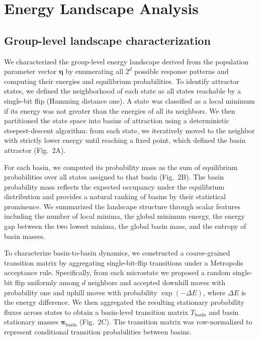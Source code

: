 \section{Energy Landscape Analysis}

\subsection{Group-level landscape characterization}

We characterized the group-level energy landscape derived from the population parameter vector $\boldsymbol{\eta}$ by enumerating all $2^d$ possible response patterns and computing their energies and equilibrium probabilities. To identify attractor states, we defined the neighborhood of each state as all states reachable by a single-bit flip (Hamming distance one). A state was classified as a local minimum if its energy was not greater than the energies of all its neighbors. We then partitioned the state space into basins of attraction using a deterministic steepest-descent algorithm: from each state, we iteratively moved to the neighbor with strictly lower energy until reaching a fixed point, which defined the basin attractor (Fig.~2A).

For each basin, we computed its probability mass as the sum of equilibrium probabilities over all states assigned to that basin (Fig.~2B). The basin probability mass reflects the expected occupancy under the equilibrium distribution and provides a natural ranking of basins by their statistical prominence. We summarized the landscape structure through scalar features including the number of local minima, the global minimum energy, the energy gap between the two lowest minima, the global basin mass, and the entropy of basin masses.

To characterize basin-to-basin dynamics, we constructed a coarse-grained transition matrix by aggregating single-bit-flip transitions under a Metropolis acceptance rule. Specifically, from each microstate we proposed a random single-bit flip uniformly among $d$ neighbors and accepted downhill moves with probability one and uphill moves with probability $\exp(-\Delta E)$, where $\Delta E$ is the energy difference. We then aggregated the resulting stationary probability fluxes across states to obtain a basin-level transition matrix $T_{\text{basin}}$ and basin stationary masses $\boldsymbol{\pi}_{\text{basin}}$ (Fig.~2C). The transition matrix was row-normalized to represent conditional transition probabilities between basins.

